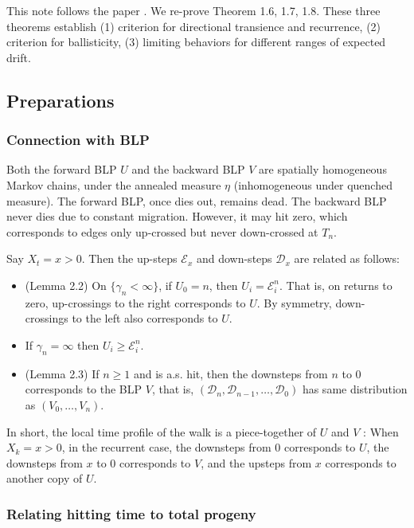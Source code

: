 
This note follows the paper \cite{kosyginaExcitedRandom2017}. We re-prove Theorem 1.6, 1.7, 1.8. These three theorems establish (1) criterion for directional transience and recurrence, (2) criterion for ballisticity, (3) limiting behaviors for different ranges of expected drift. 

\subsection{Preparations}

\subsubsection{Connection with BLP}

Both the forward BLP $U$ and the backward BLP $V$ are spatially homogeneous Markov chains, under the annealed measure $\eta$ (inhomogeneous under quenched measure). 
The forward BLP, once dies out, remains dead. The backward BLP never dies due to constant migration.
However, it may hit zero, which corresponds to edges only up-crossed but never down-crossed at $T_n$.

Say $X_t = x > 0$. Then the up-steps $\mathcal{E}_x$ and down-steps $\mathcal{D}_x$ are related as follows: 
\begin{itemize}
	\item (Lemma 2.2) On $\{\gamma_n < \infty\} $, if $U_0 = n$, then $U_i = \mathcal{E}_i^n$. That is, on returns to zero, up-crossings to the right corresponds to $U$. By symmetry, down-crossings to the left also corresponds to $U$.
	\item If $\gamma_n = \infty $ then $U_i \ge  \mathcal{E}_i^n$.
	\item (Lemma 2.3) If $n\ge 1$ and is a.s. hit, then the downsteps from $n$ to $0$ corresponds to the BLP $V$, that is, $(\mathcal{D}_n, \mathcal{D}_{n-1}, \ldots, \mathcal{D}_0)$ has same distribution as $(V_0, \ldots, V_n)$.
\end{itemize}
In short, the local time profile of the walk is a piece-together of $U$ and $V$ : When $X_k = x > 0$, in the recurrent case, the downsteps from 0 corresponds to $U$, the downsteps from $x$ to $0$ corresponds to $V$, and the upsteps from $x$ corresponds to another copy of $U$.

\subsubsection{Relating hitting time to total progeny}

